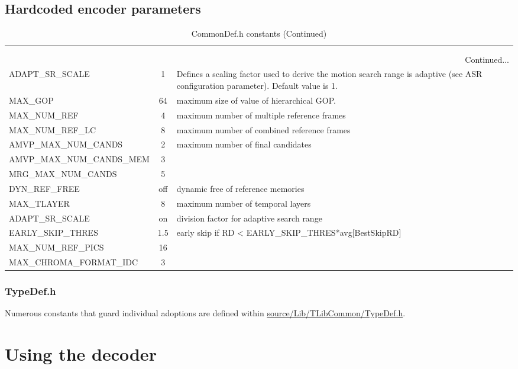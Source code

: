 ﻿\documentclass[a4paper,11pt]{jvetdoc}
\newcommand{\clearOptions}{\gdef\optOption{}\gdef\optShortOption{}\gdef\optDefault{}}
\newenvironment{MacroTable}[1]{%
	\scriptsize
	\def\arraystretch{1.3}
	\clearOptions
	\begin{longtable}{lcp{0.5\textwidth}}
	 \caption{#1} \\
	 \hline
	  \thead{Option} &
	  \thead{Default} &
	  \thead{Description} \\
	 \hline
	\endfirsthead
	 \caption[]{#1 (Continued)} \\
	 \hline
	  \thead{Option} &
	  \thead{Default} &
	  \thead{Description} \\
	 \hline
	\endhead
	 \multicolumn{3}{r}{Continued...}\\
	 \hline
	\endfoot
	 \hline
	\endlastfoot
}{%
	\end{longtable}
}
\begin{document}
\subsection{Hardcoded encoder parameters}
\begin{MacroTable}{CommonDef.h constants}
ADAPT_SR_SCALE &
1 &
Defines a scaling factor used to derive the motion search range is
adaptive (see ASR configuration parameter). Default value is 1.
\\

MAX_GOP &
64 &
maximum size of value of hierarchical GOP.
\\

MAX_NUM_REF &
4 &
maximum number of multiple reference frames
\\

MAX_NUM_REF_LC &
8 &
maximum number of combined reference frames
\\

AMVP_MAX_NUM_CANDS &
2 &
maximum number of final candidates
\\

AMVP_MAX_NUM_CANDS_MEM &
3 &
\\

MRG_MAX_NUM_CANDS &
5 &
\\

DYN_REF_FREE &
off &
dynamic free of reference memories
\\

MAX_TLAYER &
8 &
maximum number of temporal layers
\\

ADAPT_SR_SCALE &
on &
division factor for adaptive search range
\\

EARLY_SKIP_THRES &
1.5 &
early skip if RD < EARLY_SKIP_THRES*avg[BestSkipRD]
\\

MAX_NUM_REF_PICS &
16 &
\\

MAX_CHROMA_FORMAT_IDC &
3 &
\\
\end{MacroTable}

\subsubsection*{TypeDef.h}
Numerous constants that guard individual adoptions are defined within
\url{source/Lib/TLibCommon/TypeDef.h}.


\clearpage
\section{Using the decoder}
\end{document}
